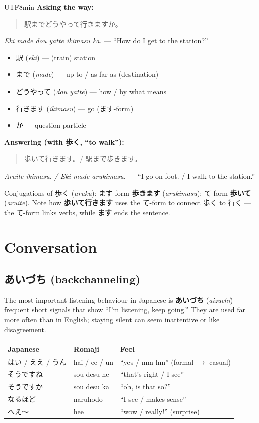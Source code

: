 \documentclass[11pt]{article}
\begin{document}
\begin{CJK}{UTF8}{min}
\textbf{Asking the way:}
\begin{quote}
駅までどうやって行きますか。
\end{quote}
\emph{Eki made dou yatte ikimasu ka.} --- ``How do I get to the station?''

\begin{itemize}
  \item 駅 (\emph{eki}) --- (train) station
  \item まで (\emph{made}) --- up to / as far as (destination)
  \item どうやって (\emph{dou yatte}) --- how / by what means
  \item 行きます (\emph{ikimasu}) --- go (ます-form)
  \item か --- question particle
\end{itemize}

\textbf{Answering (with 歩く, ``to walk''):}
\begin{quote}
歩いて行きます。\quad / \quad 駅まで歩きます。
\end{quote}
\emph{Aruite ikimasu. / Eki made arukimasu.} --- ``I go on foot. / I walk to
the station.''

Conjugations of 歩く (\emph{aruku}): ます-form \textbf{歩きます}
(\emph{arukimasu}); て-form \textbf{歩いて} (\emph{aruite}). Note how
\textbf{歩いて行きます} uses the て-form to connect 歩く to 行く --- the て-form
links verbs, while \textbf{ます} ends the sentence.


\section{Conversation}

\subsection{\texorpdfstring{あいづち}{aizuchi} (backchanneling)}
The most important listening behaviour in Japanese is \textbf{あいづち}
(\emph{aizuchi}) --- frequent short signals that show ``I'm listening, keep
going.'' They are used far more often than in English; staying silent can seem
inattentive or like disagreement.
\begin{center}
\begin{tabular}{@{}lll@{}}
\toprule
Japanese & Romaji & Feel \\
\midrule
はい / ええ / うん & hai / ee / un & ``yes / mm-hm'' (formal $\rightarrow$ casual) \\
そうですね         & sou desu ne   & ``that's right / I see'' \\
そうですか         & sou desu ka   & ``oh, is that so?'' \\
なるほど           & naruhodo      & ``I see / makes sense'' \\
へえ〜             & hee           & ``wow / really!'' (surprise) \\
\bottomrule
\end{tabular}
\end{center}


\end{CJK}
\end{document}
